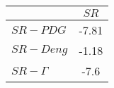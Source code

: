 \begin{tabular}{l|c}
\toprule
{} &  $SR$ \\
\midrule
\textbf{$SR-PDG$   } & -7.81 \\
\textbf{$SR-Deng$  } & -1.18 \\
\textbf{$SR-\Gamma$} &  -7.6 \\
\bottomrule
\end{tabular}
